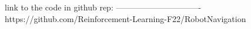 link to the code in github rep:
-------------------------------
https://github.com/Reinforcement-Learning-F22/RobotNavigation

